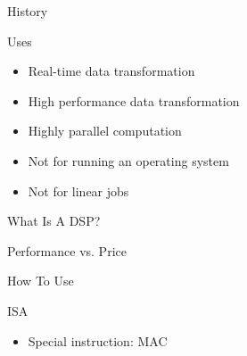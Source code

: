\documentclass{beamer}
\begin{document}
\begin{frame}{History}
\end{frame}

\begin{frame}{Uses}
    \begin{itemize}
        \item Real-time data transformation %
        \item High performance data transformation %
        \item Highly parallel computation %
        \item Not for running an operating system
        \item Not for linear jobs
    \end{itemize}
\end{frame}

\begin{frame}{What Is A DSP?}
\end{frame}

\begin{frame}{Performance vs. Price}
\end{frame}

\begin{frame}{How To Use}
\end{frame}

\begin{frame}{ISA}
    \begin{itemize}
        \item Special instruction: MAC
    \end{itemize}
\end{frame}
\end{document}
